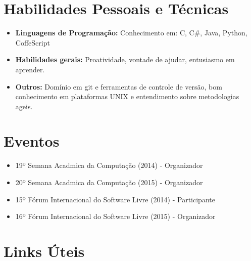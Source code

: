 \documentclass[11pt,a4paper,sans]{moderncv}        %
\begin{document}
\section{Habilidades Pessoais e Técnicas}

\vspace{6pt}

\begin{itemize}

\item \textbf{Linguagens de Programação:} Conhecimento em: C, C\#, Java, Python, CoffeScript \vspace{6pt}

\item \textbf{Habilidades gerais:} Proatividade, vontade de ajudar, entusiasmo em aprender.

\vspace{6pt}

\item \textbf{Outros:} Domínio em git e ferramentas de controle de versão, bom conhecimento em plataformas UNIX e entendimento sobre metodologias ageis.

\end{itemize}


\section{Eventos}

\vspace{6pt}
 
\begin{itemize}

\item{19º Semana Acadmica da Computação (2014) - Organizador}
\item{20º Semana Acadmica da Computação (2015)  - Organizador}
\item{15º Fórum Internacional do Software Livre (2014) - Participante}
\item{16º Fórum Internacional do Software Livre (2015) - Organizador}

\end{itemize}

\section{Links Úteis}

\vspace{6pt}
 
\end{document}
